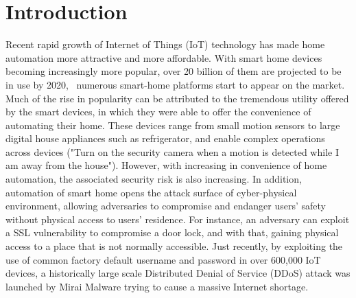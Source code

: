 \section{Introduction}




Recent rapid growth of Internet of Things (IoT) technology has made home automation more attractive and more affordable. With smart home devices becoming increasingly more popular, over 20 billion of them are projected to be in use by 2020,~\cite{iot-adoption} numerous smart-home platforms start to appear on the market. Much of the rise in popularity can be attributed to the tremendous utility offered by the smart devices, in which they were able to offer the convenience of automating their home. These devices range from small motion sensors to large digital house appliances such as refrigerator, and enable complex operations across devices (\eg "Turn on the security camera when a motion is detected while I am away from the house"). However, with increasing in convenience of home automation, the associated security risk is also increasing. In addition, automation of smart home opens the attack surface of cyber-physical environment, allowing adversaries to compromise and endanger users' safety without physical access to users' residence. For instance, an adversary can exploit a SSL vulnerability to compromise a door lock, and with that, gaining physical access to a place that is not normally accessible. Just recently, by exploiting the use of common factory default username and password in over 600,000 IoT devices, a historically large scale Distributed Denial of Service (DDoS) attack was launched by Mirai Malware trying to cause a massive Internet shortage.~\cite{tzl+17}


